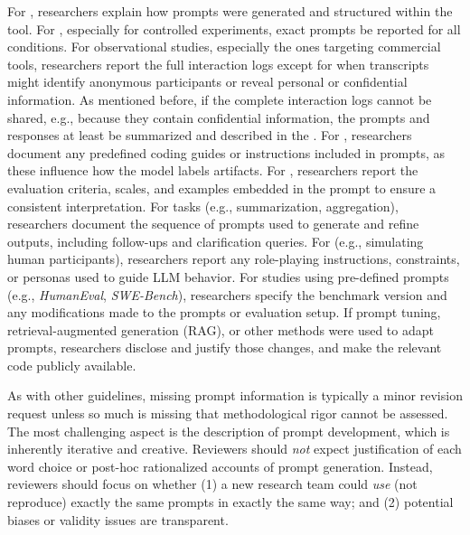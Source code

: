 For \newtools, researchers \must explain how prompts were generated and structured within the tool.
For \llmusage, especially for controlled experiments, exact prompts \must be reported for all conditions.
For observational studies, especially the ones targeting commercial tools, researchers \must report the full interaction logs except for when transcripts might identify anonymous participants or reveal personal or confidential information.
As mentioned before, if the complete interaction logs cannot be shared, e.g., because they contain confidential information, the prompts and responses \must at least be summarized and described in the \paper.
For \annotators, researchers \must document any predefined coding guides or instructions included in prompts, as these influence how the model labels artifacts.
For \judges, researchers \must report the evaluation criteria, scales, and examples embedded in the prompt to ensure a consistent interpretation.
For \synthesis tasks (e.g., summarization, aggregation), researchers \must document the sequence of prompts used to generate and refine outputs, including follow-ups and clarification queries.
For \subjects (e.g., simulating human participants), researchers \must report any role-playing instructions, constraints, or personas used to guide LLM behavior.
For \benchmarkingtasks studies using pre-defined prompts (e.g., \emph{HumanEval}, \emph{SWE-Bench}), researchers \must specify the benchmark version and any modifications made to the prompts or evaluation setup.
If prompt tuning, retrieval-augmented generation (RAG), or other methods were used to adapt prompts, researchers \must disclose and justify those changes, and \should make the relevant code publicly available.


As with other guidelines, missing prompt information is typically a minor revision request unless so much is missing that methodological rigor cannot be assessed. The most challenging aspect is the description of prompt development, which is inherently iterative and creative. Reviewers should \textit{not} expect justification of each word choice or post-hoc rationalized accounts of prompt generation. Instead, reviewers should focus on whether (1) a new research team could \textit{use} (not reproduce) exactly the same prompts in exactly the same way; and (2) potential biases or validity issues are transparent.


